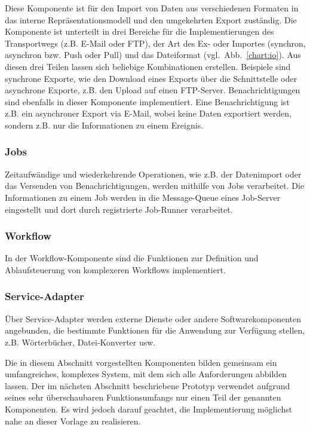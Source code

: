 Diese Komponente ist für den Import von Daten aus verschiedenen Formaten in das interne Repräsentationsmodell und den umgekehrten Export zuständig. Die Komponente ist unterteilt in drei Bereiche für die Implementierungen des Transportwegs (z.B. E-Mail oder FTP), der Art des Ex- oder Importes (synchron, asynchron bzw. Push oder Pull) und das Dateiformat (vgl.~Abb.~\ref{chart:io}). Aus diesen drei Teilen lassen sich beliebige Kombinationen erstellen. Beispiele sind synchrone Exporte, wie den Download eines Exports über die Schnittstelle oder asynchrone Exporte, z.B. den Upload auf einen FTP-Server. Benachrichtigungen sind ebenfalls in dieser Komponente implementiert. Eine Benachrichtigung ist z.B. ein asynchroner Export via E-Mail, wobei keine Daten exportiert werden, sondern z.B. nur die Informationen zu einem Ereignis.

\subsubsection{Jobs}

Zeitaufwändige und wiederkehrende Operationen, wie z.B. der Datenimport oder das Versenden von Benachrichtigungen, werden mithilfe von Jobs verarbeitet. Die Informationen zu einem Job werden in die Message-Queue eines Job-Server eingestellt und dort durch registrierte Job-Runner verarbeitet.

\subsubsection{Workflow}

In der Workflow-Komponente sind die Funktionen zur Definition und Ablaufsteuerung von komplexeren Workflows implementiert.

\subsubsection{Service-Adapter}

Über Service-Adapter werden externe Dienste oder andere Softwarekomponenten angebunden, die bestimmte Funktionen für die Anwendung zur Verfügung stellen, z.B. Wörterbücher, Datei-Konverter usw.

\secbar

Die in diesem Abschnitt vorgestellten Komponenten bilden gemeinsam ein umfangreiches, komplexes System, mit dem sich alle Anforderungen abbilden lassen. Der im nächsten Abschnitt beschriebene Prototyp verwendet aufgrund seines sehr überschaubaren Funktionsumfangs nur einen Teil der genannten Komponenten. Es wird jedoch darauf geachtet, die Implementierung möglichst nahe an dieser Vorlage zu realisieren.

